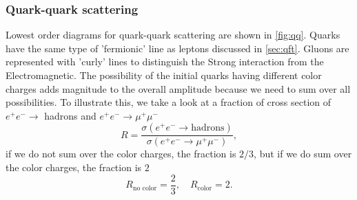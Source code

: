 \subsubsection*{Quark-quark scattering}
Lowest order diagrams for quark-quark scattering are shown in \cref{fig:qq}.
Quarks have the same type of 'fermionic' line as leptons discussed in \cref{sec:qft}.
Gluons are represented with 'curly' lines to distinguish the Strong interaction from the Electromagnetic.
The possibility of the initial quarks having different color charges adds magnitude to the overall amplitude because we need to sum over all possibilities. 
To illustrate this, we take a look at a fraction of cross section of $e^+ e^- \rightarrow$ hadrons and $e^+ e^- \rightarrow \mu^+ \mu^-$
\begin{equation}
    R = \frac{\sigma(e^+ e^- \rightarrow \text{hadrons})}{\sigma(e^+ e^- \rightarrow \mu^+ \mu^-)},
\end{equation}
if we do not sum over the color charges, the fraction is $2/3$, but if we do sum over the color charges, the fraction is $2$
\begin{equation}
    R_{\text{no color}} = \frac{2}{3}, \quad R_{\text{color}} = 2.
\end{equation}


